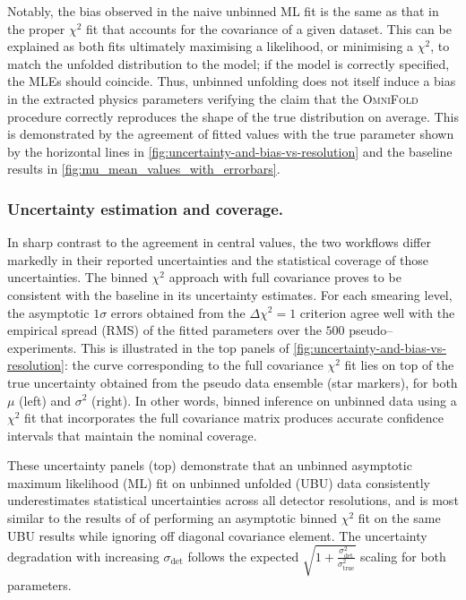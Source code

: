             Notably, the bias observed in the naive unbinned ML fit is the same as that in the proper $\chi^2$ fit that accounts for the covariance of a given dataset. 
            This can be explained as both fits ultimately maximising a likelihood, or minimising a $\chi^2$, to match the unfolded distribution to the model;
            if the model is correctly specified, the MLEs should coincide.
            Thus, unbinned unfolding does not itself induce a bias in the extracted physics parameters verifying the claim that the \textsc{OmniFold} procedure correctly reproduces the shape of the true distribution on average.
            This is demonstrated by the agreement of fitted values with the true parameter shown by the horizontal lines in \cref{fig:uncertainty-and-bias-vs-resolution} and the baseline results in \cref{fig:mu_mean_values_with_errorbars}. 
            
        \subsubsection{Uncertainty estimation and coverage.}
            In sharp contrast to the agreement in central values, the two workflows differ markedly in their reported uncertainties and the statistical coverage of those uncertainties.
            The binned $\chi^2$ approach with full covariance proves to be consistent with the baseline in its uncertainty estimates.
            For each smearing level, the asymptotic $1\sigma$ errors obtained from the $\Delta\chi^2=1$ criterion agree well with the empirical spread (RMS) of the fitted parameters over the \(\num{500}\) pseudo--experiments.
            This is illustrated in the top panels of \cref{fig:uncertainty-and-bias-vs-resolution}: the curve corresponding to the full covariance $\chi^2$ fit lies on top of the true uncertainty obtained from the pseudo data ensemble (star markers), for both $\mu$ (left) and $\sigma^2$ (right).
            In other words, binned inference on unbinned data using a \(\chi^2\) fit that incorporates the full covariance matrix produces accurate confidence intervals that maintain the nominal coverage.
            
            These uncertainty panels (top) demonstrate that an unbinned asymptotic maximum likelihood (ML) fit on unbinned unfolded (UBU) data consistently underestimates statistical uncertainties across all detector resolutions, and is most similar to the results of of performing an asymptotic binned \(\chi^2\) fit on the same UBU results while ignoring off diagonal covariance element.
            The uncertainty degradation with increasing $\sigma_{\text{det}}$ follows the expected $\displaystyle\sqrt{1 + \frac{\sigma^2_{\text{det}}}{\sigma^2_{\text{true}}}}$ scaling for both parameters.

